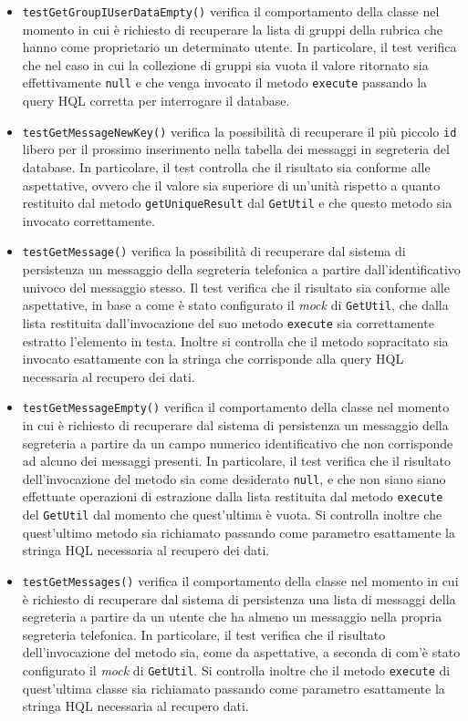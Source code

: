 \begin{itemize}
\begin{itemize}
\item \texttt{testGetGroupIUserDataEmpty()} verifica il comportamento della classe nel momento in cui è richiesto di recuperare la lista di gruppi della rubrica che hanno come proprietario un determinato utente. In particolare, il test verifica che nel caso in cui la collezione di gruppi sia vuota il valore ritornato sia effettivamente \texttt{null} e che venga invocato il metodo \texttt{execute} passando la query HQL corretta per interrogare il database.

\item \texttt{testGetMessageNewKey()} verifica la possibilità di recuperare il più piccolo \texttt{id} libero per il prossimo inserimento nella tabella dei messaggi in segreteria del database. In particolare, il test controlla che il risultato sia conforme alle aspettative, ovvero che il valore sia superiore di un'unità rispetto a quanto restituito dal metodo \texttt{getUniqueResult} dal \texttt{GetUtil} e che questo metodo sia invocato correttamente.

\item \texttt{testGetMessage()} verifica la possibilità di recuperare dal sistema di persistenza un messaggio della segreteria telefonica a partire dall'identificativo univoco del messaggio stesso. Il test verifica che il risultato sia conforme alle aspettative, in base a come è stato configurato il \textit{mock} di \texttt{GetUtil}, che dalla lista restituita dall'invocazione del suo metodo \texttt{execute} sia correttamente estratto l'elemento in testa. Inoltre si controlla che il metodo sopracitato sia invocato esattamente con la stringa che corrisponde alla query HQL necessaria al recupero dei dati.

\item \texttt{testGetMessageEmpty()} verifica il comportamento della classe nel momento in cui è richiesto di recuperare dal sistema di persistenza un messaggio della segreteria a partire da un campo numerico identificativo che non corrisponde ad alcuno dei messaggi presenti. In particolare, il test verifica che il risultato dell'invocazione del metodo sia come desiderato \texttt{null}, e che non siano siano effettuate operazioni di estrazione dalla lista restituita dal metodo \texttt{execute} del \texttt{GetUtil} dal momento che quest'ultima è vuota.
Si controlla inoltre che quest'ultimo metodo sia richiamato passando come parametro esattamente la stringa HQL necessaria al recupero dei dati.

\item \texttt{testGetMessages()} verifica il comportamento della classe nel momento in cui è richiesto di recuperare dal sistema di persistenza una lista di messaggi della segreteria a partire da un utente che ha almeno un messaggio nella propria segreteria telefonica. In particolare, il test verifica che il risultato dell'invocazione del metodo sia, come da aspettative, a seconda di com'è stato configurato il \textit{mock} di \texttt{GetUtil}. Si controlla inoltre che il metodo \texttt{execute} di quest'ultima classe sia richiamato passando come parametro esattamente la stringa HQL necessaria al recupero dati.


\end{itemize}
\end{itemize}
